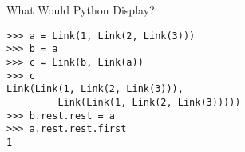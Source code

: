 \begin{blocksection}
\question What Would Python Display?
\newline
\begin{lstlisting}
>>> a = Link(1, Link(2, Link(3)))
>>> b = a
>>> c = Link(b, Link(a))
>>> c
Link(Link(1, Link(2, Link(3))), 
         Link(Link(1, Link(2, Link(3)))))
>>> b.rest.rest = a
>>> a.rest.rest.first
1
\end{lstlisting}
\begin{solution}
\end{solution}
\end{blocksection}